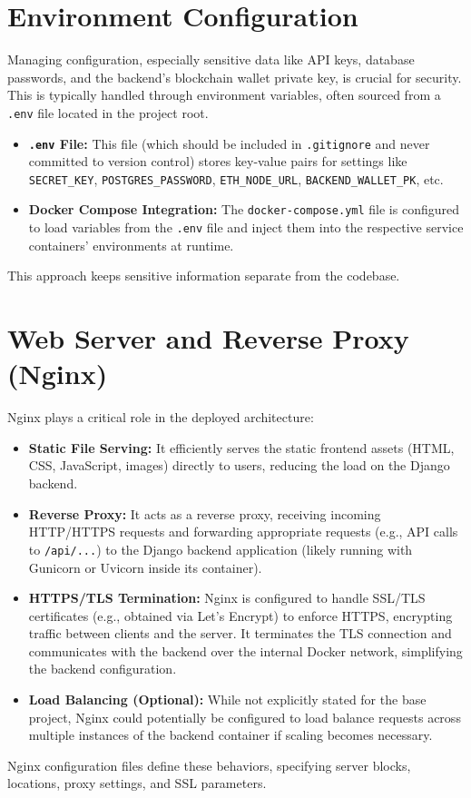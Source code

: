 \section{Environment Configuration}
\label{sec:env_config}
Managing configuration, especially sensitive data like API keys, database passwords, and the backend's blockchain wallet private key, is crucial for security. This is typically handled through environment variables, often sourced from a \texttt{.env} file located in the project root.
\begin{itemize}
    \item \textbf{\texttt{.env} File:} This file (which should be included in \texttt{.gitignore} and never committed to version control) stores key-value pairs for settings like \texttt{SECRET\_KEY}, \texttt{POSTGRES\_PASSWORD}, \texttt{ETH\_NODE\_URL}, \texttt{BACKEND\_WALLET\_PK}, etc.
    \item \textbf{Docker Compose Integration:} The \texttt{docker-compose.yml} file is configured to load variables from the \texttt{.env} file and inject them into the respective service containers' environments at runtime.
\end{itemize}
This approach keeps sensitive information separate from the codebase.

\section{Web Server and Reverse Proxy (Nginx)}
\label{sec:nginx_config}
Nginx plays a critical role in the deployed architecture:
\begin{itemize}
    \item \textbf{Static File Serving:} It efficiently serves the static frontend assets (HTML, CSS, JavaScript, images) directly to users, reducing the load on the Django backend.
    \item \textbf{Reverse Proxy:} It acts as a reverse proxy, receiving incoming HTTP/HTTPS requests and forwarding appropriate requests (e.g., API calls to \texttt{/api/...}) to the Django backend application (likely running with Gunicorn or Uvicorn inside its container).
    \item \textbf{HTTPS/TLS Termination:} Nginx is configured to handle SSL/TLS certificates (e.g., obtained via Let's Encrypt) to enforce HTTPS, encrypting traffic between clients and the server. It terminates the TLS connection and communicates with the backend over the internal Docker network, simplifying the backend configuration.
    \item \textbf{Load Balancing (Optional):} While not explicitly stated for the base project, Nginx could potentially be configured to load balance requests across multiple instances of the backend container if scaling becomes necessary.
\end{itemize}
Nginx configuration files define these behaviors, specifying server blocks, locations, proxy settings, and SSL parameters.

